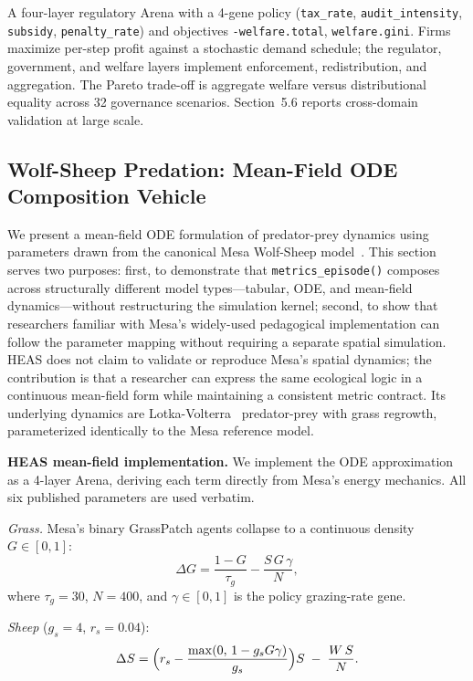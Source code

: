 \documentclass{wscpaperproc}
\begin{document}
A four-layer regulatory Arena with a 4-gene policy
(\texttt{tax\_rate}, \texttt{audit\_intensity}, \texttt{subsidy},
\texttt{penalty\_rate}) and objectives \texttt{-welfare.total},
\texttt{welfare.gini}. Firms maximize per-step profit against a stochastic
demand schedule; the regulator, government, and welfare layers implement
enforcement, redistribution, and aggregation. The Pareto trade-off is
aggregate welfare versus distributional equality across 32 governance scenarios.
Section~5.6 reports cross-domain validation at large scale.

\subsection{Wolf-Sheep Predation: Mean-Field ODE Composition Vehicle}
\label{sec:wolfsheep}

We present a mean-field ODE formulation of predator-prey dynamics using
parameters drawn from the canonical Mesa Wolf-Sheep model~\cite{wilensky1997wolfsheep,kazil2020mesa}.
This section serves two purposes: first, to demonstrate that
\texttt{metrics\_episode()} composes across structurally different model
types---tabular, ODE, and mean-field dynamics---without restructuring the
simulation kernel; second, to show that researchers familiar with Mesa's
widely-used pedagogical implementation can follow the parameter mapping without
requiring a separate spatial simulation. HEAS does not claim to validate or
reproduce Mesa's spatial dynamics; the contribution is that a researcher can
express the same ecological logic in a continuous mean-field form while
maintaining a consistent metric contract.
Its underlying dynamics are Lotka-Volterra~\cite{lotka1925elements,volterra1926variazioni} predator-prey with grass regrowth,
parameterized identically to the Mesa reference model.

\textbf{HEAS mean-field implementation.} We implement the ODE approximation as a
4-layer Arena, deriving each term directly from Mesa's energy mechanics.
All six published parameters are used verbatim.

\textit{Grass.} Mesa's binary GrassPatch agents collapse to a continuous
density $G\in[0,1]$:
\begin{equation}
  \Delta G = \frac{1-G}{\tau_g} - \frac{S\,G\,\gamma}{N},
  \label{eq:grass}
\end{equation}
where $\tau_g\!=\!30$, $N\!=\!400$, and $\gamma\!\in\![0,1]$ is the policy
grazing-rate gene.

\textit{Sheep} ($g_s\!=\!4$, $r_s\!=\!0.04$):
\begin{equation}
  \Delta S = \Bigl(r_s - \frac{\max(0,\,1-g_s G\gamma)}{g_s}\Bigr)S
             \;-\; \frac{W\,S}{N}.
  \label{eq:sheep}
\end{equation}
\end{document}
